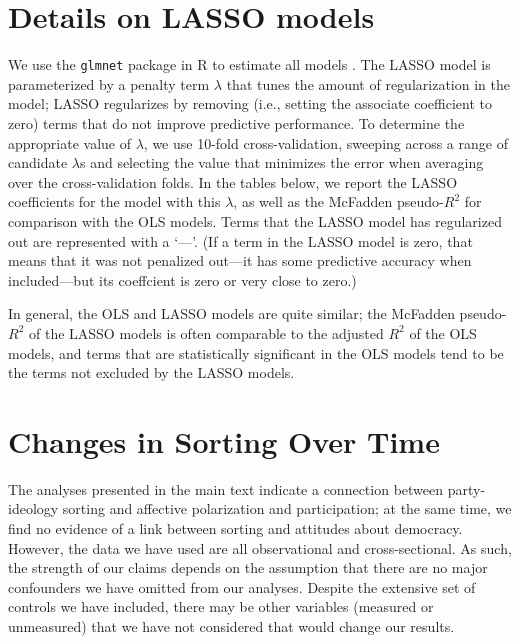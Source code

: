 \documentclass[10pt,landscape]{article}
\begin{document}
\listoffigures
\listoftables
\clearpage

\section{Details on LASSO models}

We use the \texttt{glmnet} package in R to estimate all models \parencite{simon_regularization_2011}. 
The LASSO model is parameterized by a penalty term \(\lambda\) that tunes the amount of regularization in the model; LASSO regularizes by removing (i.e., setting the associate coefficient to zero) terms that do not improve predictive performance.
To determine the appropriate value of \(\lambda\), we use 10-fold cross-validation, sweeping across a range of candidate \(\lambda\)s and selecting the value that minimizes the error when averaging over the cross-validation folds.
In the tables below, we report the LASSO coefficients for the model with this \(\lambda\), as well as the McFadden pseudo-\(R^2\) for comparison with the OLS models.
Terms that the LASSO model has regularized out are represented with a `---'. 
(If a term in the LASSO model is zero, that means that it was not penalized out---it has some predictive accuracy when included---but its coeffcient is zero or very close to zero.)

In general, the OLS and LASSO models are quite similar; the McFadden pseudo-\(R^2\) of the LASSO models is often comparable to the adjusted \(R^2\) of the OLS models, and terms that are statistically significant in the OLS models tend to be the terms not excluded by the LASSO models. 

\clearpage
\section{Changes in Sorting Over Time}
The analyses presented in the main text indicate a connection between party-ideology sorting and affective polarization and participation; at the same time, we find no evidence of a link between sorting and attitudes about democracy.
However, the data we have used are all observational and cross-sectional. 
As such, the strength of our claims depends on the assumption that there are no major confounders we have omitted from our analyses. 
Despite the extensive set of controls we have included, there may be other variables (measured or unmeasured) that we have not considered that would change our results.
\end{document}

